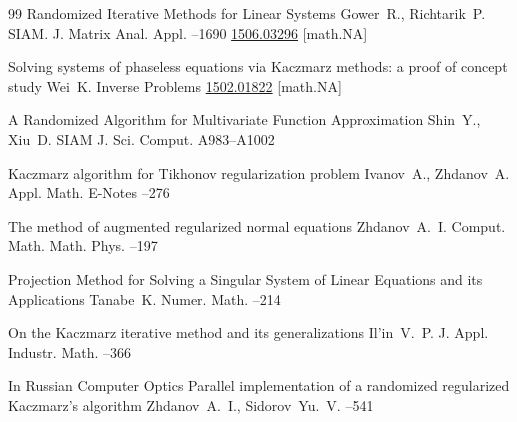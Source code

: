 \begin{thebibliography}{99}
\paper Randomized Iterative Methods for Linear Systems
\by Gower~R., Richtarik~P.
\jour SIAM. J. Matrix Anal. Appl.
–1690
\arxiv \href{https://arxiv.org/abs/1506.03296}{1506.03296} [math.NA]

\paper Solving systems of phaseless equations via Kaczmarz methods: a proof of concept study
\by Wei~K.
\jour Inverse Problems
\arxiv \href{https://arxiv.org/abs/1502.01822}{1502.01822} [math.NA]

\paper A Randomized Algorithm for Multivariate Function Approximation
\by Shin~Y., Xiu~D.
\jour SIAM J. Sci. Comput.
\pages A983--A1002


\paper Kaczmarz algorithm for Tikhonov regularization problem
\by Ivanov~A., Zhdanov~A.
\jour Appl. Math. E-Notes
--276

\paper The method of augmented regularized normal equations
\by Zhdanov~A.~I.
\jour Comput. Math. Math. Phys.
--197

\paper Projection Method for Solving a Singular System of Linear Equations and its Applications
\by Tanabe~K.
\jour Numer. Math.
--214

\paper On the Kaczmarz iterative method and its generalizations
\by  Il'in~V.~P.
\jour J. Appl. Industr. Math.
--366

\lang In Russian
\jour  Computer Optics 
\paper Parallel implementation of a randomized regularized Kaczmarz's algorithm
\by Zhdanov~A.~I., Sidorov~Yu.~V. 
--541



\end{thebibliography}
